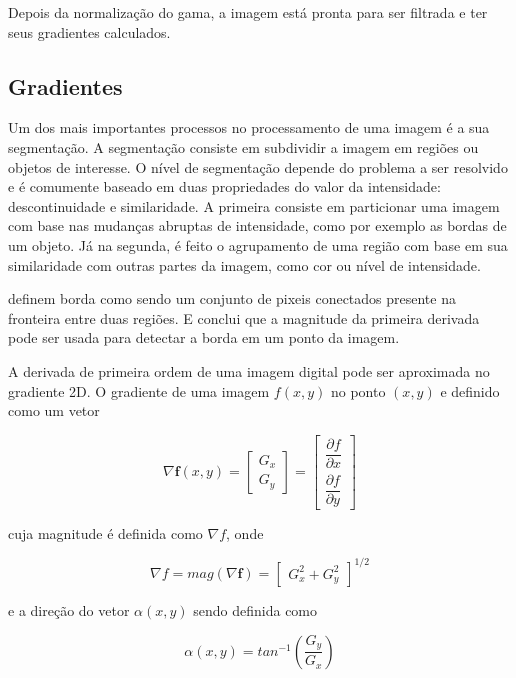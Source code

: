 Depois da normalização do gama, a imagem está pronta para ser filtrada e ter seus gradientes calculados.

\subsection{Gradientes}

Um dos mais importantes processos no processamento de uma imagem é a sua segmentação. A segmentação consiste em subdividir a imagem em regiões ou objetos de interesse. O nível de segmentação depende do problema a ser resolvido e é comumente baseado em duas propriedades do valor da intensidade: descontinuidade e similaridade. A primeira consiste em particionar uma imagem com base nas mudanças abruptas de intensidade, como por exemplo as bordas de um objeto. Já na segunda, é feito o agrupamento de uma região com base em sua similaridade com outras partes da imagem, como cor ou nível de intensidade.

 definem borda como sendo um conjunto de pixeis conectados  presente na fronteira entre duas regiões. E conclui que a magnitude da primeira derivada pode ser usada para detectar a borda em um ponto da imagem.

A derivada de primeira ordem de uma imagem digital pode ser aproximada no gradiente 2D. O gradiente de uma imagem \(f(x,y)\) no ponto \((x,y)\) e definido como um vetor

\begin{equation}
\nabla \mathbf{f}(x,y) = 
\begin{bmatrix}
G_x \\ G_y
\end{bmatrix} =
\begin{bmatrix}
\dfrac{ \partial f}{\partial x} 
\\[2ex]
\dfrac{ \partial f}{\partial y}
\end{bmatrix}
\end{equation}

cuja magnitude é definida como \(\nabla f\), onde

\begin{equation}
\nabla f = mag(\nabla \mathbf{f}) = 
\begin{bmatrix}
G_x^2 + G_y^2
\end{bmatrix}^{1/2}
\label{eq:mag}
\end{equation}

e a direção do vetor \(\alpha(x,y)\) sendo definida como

\begin{equation}
\alpha(x,y) = tan^{-1}
\left (
\dfrac{G_y}{G_x}
\right)
\end{equation}

